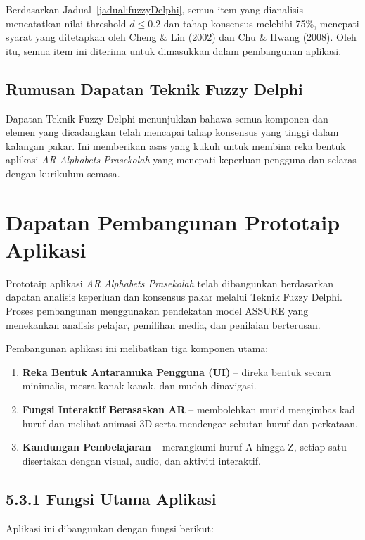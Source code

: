 {{Berdasarkan Jadual~\ref{jadual:fuzzyDelphi}, semua item yang dianalisis mencatatkan nilai threshold \(d \leq 0.2\) dan tahap konsensus melebihi 75\%, menepati syarat yang ditetapkan oleh Cheng \& Lin (2002) dan Chu \& Hwang (2008). Oleh itu, semua item ini diterima untuk dimasukkan dalam pembangunan aplikasi.

\subsection*{Rumusan Dapatan Teknik Fuzzy Delphi}

Dapatan Teknik Fuzzy Delphi menunjukkan bahawa semua komponen dan elemen yang dicadangkan telah mencapai tahap konsensus yang tinggi dalam kalangan pakar. Ini memberikan asas yang kukuh untuk membina reka bentuk aplikasi \textit{AR Alphabets Prasekolah} yang menepati keperluan pengguna dan selaras dengan kurikulum semasa.
\section{Dapatan Pembangunan Prototaip Aplikasi}

Prototaip aplikasi \textit{AR Alphabets Prasekolah} telah dibangunkan berdasarkan dapatan analisis keperluan dan konsensus pakar melalui Teknik Fuzzy Delphi. Proses pembangunan menggunakan pendekatan model ASSURE yang menekankan analisis pelajar, pemilihan media, dan penilaian berterusan.

Pembangunan aplikasi ini melibatkan tiga komponen utama:

\begin{enumerate}
  \item \textbf{Reka Bentuk Antaramuka Pengguna (UI)} – direka bentuk secara minimalis, mesra kanak-kanak, dan mudah dinavigasi.
  \item \textbf{Fungsi Interaktif Berasaskan AR} – membolehkan murid mengimbas kad huruf dan melihat animasi 3D serta mendengar sebutan huruf dan perkataan.
  \item \textbf{Kandungan Pembelajaran} – merangkumi huruf A hingga Z, setiap satu disertakan dengan visual, audio, dan aktiviti interaktif.
\end{enumerate}

\subsection*{5.3.1 Fungsi Utama Aplikasi}

Aplikasi ini dibangunkan dengan fungsi berikut:

}}
